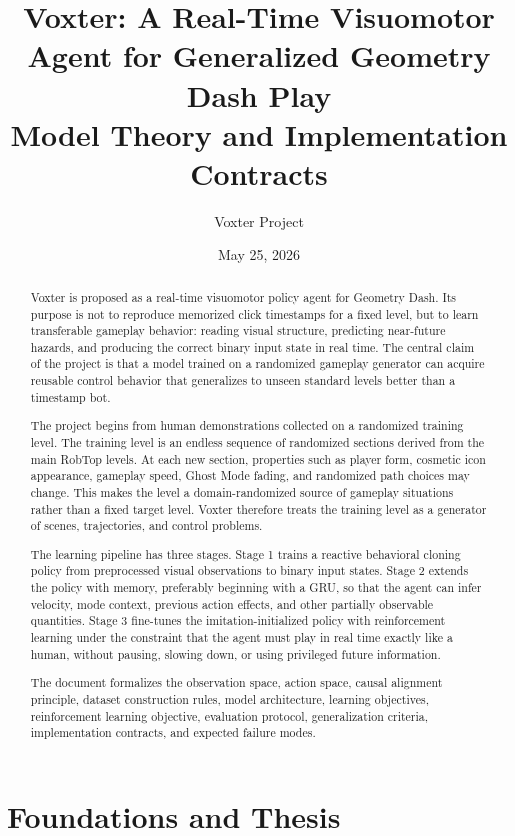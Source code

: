 \documentclass[11pt]{article}
\title{\textbf{Voxter: A Real-Time Visuomotor Agent for Generalized Geometry Dash Play}\\
\large Model Theory and Implementation Contracts}
\author{Voxter Project}
\date{May 25, 2026}
\begin{document}
\maketitle

\begin{abstract}
Voxter is proposed as a real-time visuomotor policy agent for Geometry Dash. Its purpose is not to reproduce memorized click timestamps for a fixed level, but to learn transferable gameplay behavior: reading visual structure, predicting near-future hazards, and producing the correct binary input state in real time. The central claim of the project is that a model trained on a randomized gameplay generator can acquire reusable control behavior that generalizes to unseen standard levels better than a timestamp bot.

The project begins from human demonstrations collected on a randomized training level. The training level is an endless sequence of randomized sections derived from the main RobTop levels. At each new section, properties such as player form, cosmetic icon appearance, gameplay speed, Ghost Mode fading, and randomized path choices may change. This makes the level a domain-randomized source of gameplay situations rather than a fixed target level. Voxter therefore treats the training level as a generator of scenes, trajectories, and control problems.

The learning pipeline has three stages. Stage 1 trains a reactive behavioral cloning policy from preprocessed visual observations to binary input states. Stage 2 extends the policy with memory, preferably beginning with a GRU, so that the agent can infer velocity, mode context, previous action effects, and other partially observable quantities. Stage 3 fine-tunes the imitation-initialized policy with reinforcement learning under the constraint that the agent must play in real time exactly like a human, without pausing, slowing down, or using privileged future information.

The document formalizes the observation space, action space, causal alignment principle, dataset construction rules, model architecture, learning objectives, reinforcement learning objective, evaluation protocol, generalization criteria, implementation contracts, and expected failure modes.
\end{abstract}

\begingroup
\small
\setlength{\parskip}{0pt}
\tableofcontents
\endgroup
\newpage

\section{Foundations and Thesis}
\end{document}
